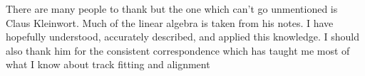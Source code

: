 There are many people to thank but the one which can't go unmentioned is Claus Kleinwort. Much of the linear algebra is taken from his notes. I have hopefully understood, accurately described, and applied this knowledge. I should also thank him for the consistent correspondence which has taught me most of what I know about track fitting and alignment
